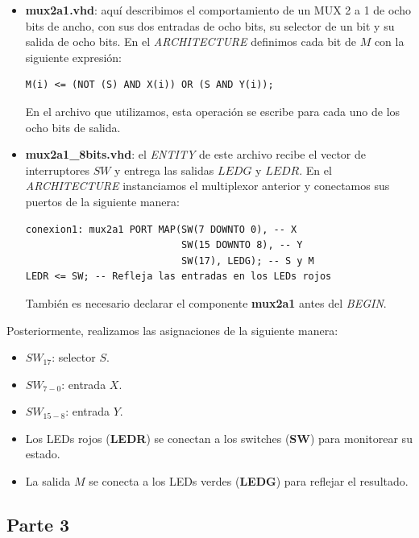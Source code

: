 \documentclass[12pt]{report}
\begin{document}
\begin{itemize}
    \item \textbf{mux2a1.vhd}: aquí describimos el comportamiento de un MUX 2 a 1 de ocho bits de ancho, con sus dos entradas de ocho bits, su selector de un bit y su salida de ocho bits. En el \textit{ARCHITECTURE} definimos cada bit de $M$ con la siguiente expresión:

    \begin{lstlisting}
M(i) <= (NOT (S) AND X(i)) OR (S AND Y(i));
    \end{lstlisting}

    En el archivo que utilizamos, esta operación se escribe para cada uno de los ocho bits de salida.

    \item \textbf{mux2a1\_8bits.vhd}: el \textit{ENTITY} de este archivo recibe el vector de interruptores $SW$ y entrega las salidas $LEDG$ y $LEDR$. En el \textit{ARCHITECTURE} instanciamos el multiplexor anterior y conectamos sus puertos de la siguiente manera:

    \begin{lstlisting}
conexion1: mux2a1 PORT MAP(SW(7 DOWNTO 0), -- X
                           SW(15 DOWNTO 8), -- Y
                           SW(17), LEDG); -- S y M
LEDR <= SW; -- Refleja las entradas en los LEDs rojos
    \end{lstlisting}

    También es necesario declarar el componente \textbf{mux2a1} antes del \textit{BEGIN}.
\end{itemize}

Posteriormente, realizamos las asignaciones de la siguiente manera:

\begin{itemize}
    \item $SW_{17}$: selector $S$.
    \item $SW_{7-0}$: entrada $X$.
    \item $SW_{15-8}$: entrada $Y$.
    \item Los LEDs rojos (\textbf{LEDR}) se conectan a los switches (\textbf{SW}) para monitorear su estado.
    \item La salida $M$ se conecta a los LEDs verdes (\textbf{LEDG}) para reflejar el resultado.
\end{itemize}

\subsection*{Parte 3}
\end{document}
